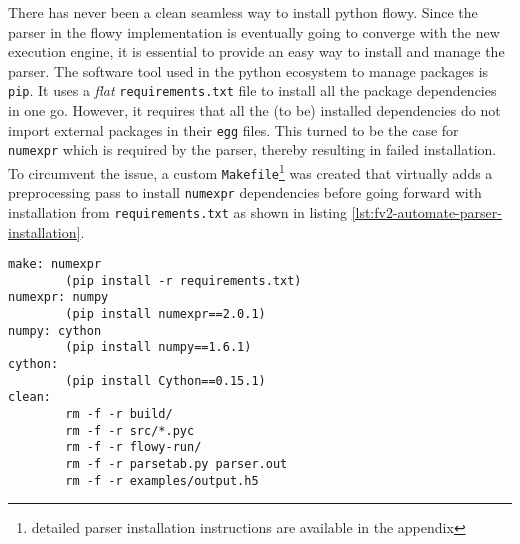 There has never been a clean seamless way to install python flowy.  Since the
parser in the flowy implementation is eventually going to converge with the
new execution engine, it is essential to provide an easy way to install and
manage the parser. The software tool used in the python ecosystem to manage
packages is \texttt{pip}. It uses a \emph{flat}  \texttt{requirements.txt} file to install all the package dependencies
in one go. However, it requires that all the (to be) installed dependencies do
not import external packages in their \texttt{egg} files. This turned to be
the case for \texttt{numexpr} which is required by the parser, thereby
resulting in failed installation.  To circumvent the issue, a custom
\texttt{Makefile}\footnote{detailed parser installation instructions are
available in the appendix} was created that virtually adds a preprocessing
pass to install \texttt{numexpr} dependencies before going forward with
installation from \texttt{requirements.txt} as shown in listing
\ref{lst:fv2-automate-parser-installation}.

\begin{lstlisting}
make: numexpr
        (pip install -r requirements.txt)
numexpr: numpy
        (pip install numexpr==2.0.1)
numpy: cython
        (pip install numpy==1.6.1)
cython:
        (pip install Cython==0.15.1)
clean:
        rm -f -r build/
        rm -f -r src/*.pyc
        rm -f -r flowy-run/
        rm -f -r parsetab.py parser.out
        rm -f -r examples/output.h5
\end{lstlisting}

